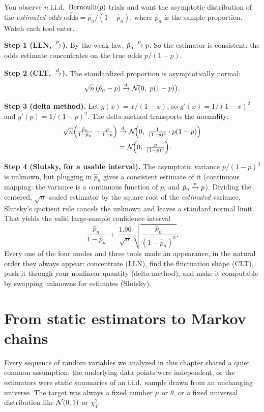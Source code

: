 \begin{example}
\label{ch22:ex-odds}
You observe $n$ i.i.d.\ $\operatorname{Bernoulli}(p)$ trials and want the asymptotic distribution of the
\emph{estimated odds} $\widehat{\text{odds}} = \hat p_n/(1-\hat p_n)$, where
$\hat p_n$ is the sample proportion. Watch each tool enter.

\textbf{Step 1 (LLN, $\xrightarrow{p}$).} By the weak law, $\hat p_n\xrightarrow{p} p$. So the estimator is
consistent: the odds estimate concentrates on the true odds $p/(1-p)$.

\textbf{Step 2 (CLT, $\xrightarrow{d}$).} The standardized proportion is asymptotically normal:
\[
  \sqrt n\,(\hat p_n - p)\xrightarrow{d}\mathcal{N}\!\big(0,\ p(1-p)\big).
\]

\textbf{Step 3 (delta method).} Let $g(x)=x/(1-x)$, so
$g'(x)=1/(1-x)^2$ and $g'(p)=1/(1-p)^2$. The delta method transports the normality:
\begin{align*}
  \sqrt n\Big(\tfrac{\hat p_n}{1-\hat p_n}-\tfrac{p}{1-p}\Big)
  &\xrightarrow{d} \mathcal{N}\!\Big(0,\ \tfrac{1}{(1-p)^4}\cdot p(1-p)\Big) \\
  &= \mathcal{N}\!\Big(0,\ \tfrac{p}{(1-p)^3}\Big).
\end{align*}

\textbf{Step 4 (Slutsky, for a usable interval).} The asymptotic variance
$p/(1-p)^3$ is unknown, but plugging in $\hat p_n$ gives a consistent estimate of it
(continuous mapping: the variance is a continuous function of $p$, and $\hat p_n\xrightarrow{p}
p$). Dividing the centered, $\sqrt n$-scaled estimator by the square root of the
\emph{estimated} variance, Slutsky's quotient rule cancels the unknown and leaves a
standard normal limit. That yields the valid large-sample confidence interval
\[
  \frac{\hat p_n}{1-\hat p_n}\ \pm\ \frac{1.96}{\sqrt n}\,
  \sqrt{\frac{\hat p_n}{(1-\hat p_n)^3}}.
\]
Every one of the four modes and three tools made an appearance, in the natural order
they always appear: concentrate (LLN), find the fluctuation shape (CLT), push it
through your nonlinear quantity (delta method), and make it computable by swapping
unknowns for estimates (Slutsky).
\end{example}

\section{From static estimators to Markov chains}
\label{ch22:bridge}

Every sequence of random variables we analyzed in this chapter shared a quiet
common assumption: the underlying data points were independent, or the estimators
were static summaries of an i.i.d.\ sample drawn from an unchanging universe. The
target was always a fixed number $\mu$ or $\theta$, or a fixed universal distribution
like $\mathcal{N}(0,1)$ or $\chi^2_1$.

